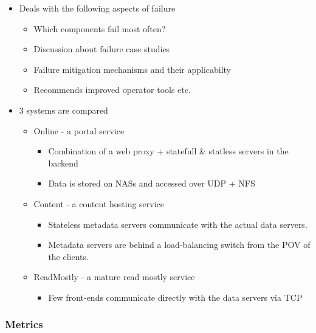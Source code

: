 \documentclass[a4paper]{article}
\begin{document}
\begin{itemize}
\item
    Deals with the following aspects of failure

    \begin{itemize}
        \item
        Which components fail most often?
    \item
        Discussion about failure case studies
    \item
        Failure mitigation mechanisms and their applicabilty
    \item
        Recommends improved operator tools etc.
    \end{itemize}
\item
    3 systems are compared

    \begin{itemize}
        \item
        Online - a portal service

        \begin{itemize}
                \item
            Combination of a web proxy + statefull \& statless servers in the
            backend
        \item
            Data is stored on NASs and accessed over UDP + NFS
        \end{itemize}
    \item
        Content - a content hosting service

        \begin{itemize}
                \item
            Stateless metadata servers communicate with the actual data
            servers.
        \item
            Metadata servers are behind a load-balancing switch from the POV
            of the clients.
        \end{itemize}
    \item
        ReadMostly - a mature read mostly service

        \begin{itemize}
                \item
            Few front-ends communicate directly with the data servers via TCP
        \end{itemize}
    \end{itemize}
\end{itemize}

\subsubsection{Metrics}
\end{document}
